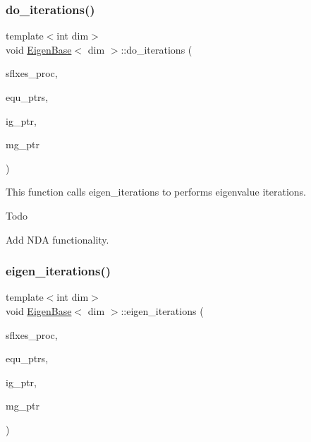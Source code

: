 \subsubsection{\texorpdfstring{do\+\_\+iterations()}{do\_iterations()}}
{\footnotesize\ttfamily template$<$int dim$>$ \\
void \hyperlink{class_eigen_base}{Eigen\+Base}$<$ dim $>$\+::do\+\_\+iterations (\begin{DoxyParamCaption}\item[{std\+::vector$<$ Vector$<$ double $>$ $>$ \&}]{sflxes\+\_\+proc,  }\item[{std\+::vector$<$ std\+\_\+cxx11\+::shared\+\_\+ptr$<$ \hyperlink{class_equation_base}{Equation\+Base}$<$ dim $>$ $>$ $>$ \&}]{equ\+\_\+ptrs,  }\item[{std\+\_\+cxx11\+::shared\+\_\+ptr$<$ \hyperlink{class_i_g_base}{I\+G\+Base}$<$ dim $>$ $>$}]{ig\+\_\+ptr,  }\item[{std\+\_\+cxx11\+::shared\+\_\+ptr$<$ \hyperlink{class_m_g_base}{M\+G\+Base}$<$ dim $>$ $>$}]{mg\+\_\+ptr }\end{DoxyParamCaption})\hspace{0.3cm}{\ttfamily [virtual]}}

This function calls eigen\+\_\+iterations to performs eigenvalue iterations.

\begin{DoxyRefDesc}{Todo}
\item[\hyperlink{todo__todo000002}{Todo}]Add N\+DA functionality. \end{DoxyRefDesc}
\mbox{\label{class_eigen_base_ae09830ed4bcb14b7b699cd5f5460fab7}} 
\subsubsection{\texorpdfstring{eigen\+\_\+iterations()}{eigen\_iterations()}}
{\footnotesize\ttfamily template$<$int dim$>$ \\
void \hyperlink{class_eigen_base}{Eigen\+Base}$<$ dim $>$\+::eigen\+\_\+iterations (\begin{DoxyParamCaption}\item[{std\+::vector$<$ Vector$<$ double $>$ $>$ \&}]{sflxes\+\_\+proc,  }\item[{std\+::vector$<$ std\+\_\+cxx11\+::shared\+\_\+ptr$<$ \hyperlink{class_equation_base}{Equation\+Base}$<$ dim $>$ $>$ $>$ \&}]{equ\+\_\+ptrs,  }\item[{std\+\_\+cxx11\+::shared\+\_\+ptr$<$ \hyperlink{class_i_g_base}{I\+G\+Base}$<$ dim $>$ $>$}]{ig\+\_\+ptr,  }\item[{std\+\_\+cxx11\+::shared\+\_\+ptr$<$ \hyperlink{class_m_g_base}{M\+G\+Base}$<$ dim $>$ $>$}]{mg\+\_\+ptr }\end{DoxyParamCaption})\hspace{0.3cm}{\ttfamily [virtual]}}


